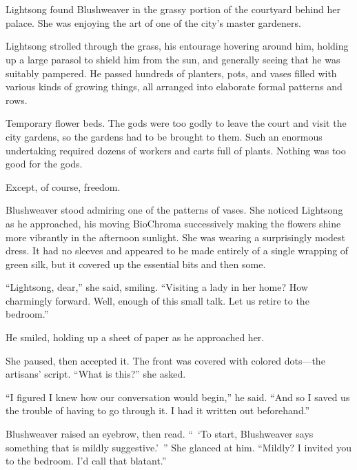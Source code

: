 \chapter{}

Lightsong found Blushweaver in the grassy portion of the courtyard behind her palace. She was enjoying the art of one of the city’s master gardeners.

Lightsong strolled through the grass, his entourage hovering around him, holding up a large parasol to shield him from the sun, and generally seeing that he was suitably pampered. He passed hundreds of planters, pots, and vases filled with various kinds of growing things, all arranged into elaborate formal patterns and rows.

Temporary flower beds. The gods were too godly to leave the court and visit the city gardens, so the gardens had to be brought to them. Such an enormous undertaking required dozens of workers and carts full of plants. Nothing was too good for the gods.

Except, of course, freedom.

Blushweaver stood admiring one of the patterns of vases. She noticed Lightsong as he approached, his moving BioChroma successively making the flowers shine more vibrantly in the afternoon sunlight. She was wearing a surprisingly modest dress. It had no sleeves and appeared to be made entirely of a single wrapping of green silk, but it covered up the essential bits and then some.

“Lightsong, dear,” she said, smiling. “Visiting a lady in her home? How charmingly forward. Well, enough of this small talk. Let us retire to the bedroom.”

He smiled, holding up a sheet of paper as he approached her.

She paused, then accepted it. The front was covered with colored dots—the artisans’ script. “What is this?” she asked.

“I figured I knew how our conversation would begin,” he said. “And so I saved us the trouble of having to go through it. I had it written out beforehand.”

Blushweaver raised an eyebrow, then read. “~‘To start, Blushweaver says something that is mildly suggestive.’~” She glanced at him. “Mildly? I invited you to the bedroom. I’d call that blatant.”

